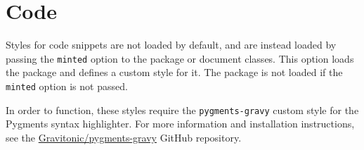 \documentclass{l3doc}
\begin{document}
\section{Code}

Styles for code snippets are not loaded by default, and are instead loaded by passing the \texttt{minted} option to the  package or document classes. This option loads the  package and defines a custom style for it. The  package is not loaded if the \texttt{minted} option is not passed.

In order to function, these styles require the \texttt{pygments-gravy} custom style for the Pygments syntax highlighter. For more information and installation instructions, see the \href{https://github.com/Gravitonic/pygments-gravy}{Gravitonic/pygments-gravy} GitHub repository.
\end{document}
